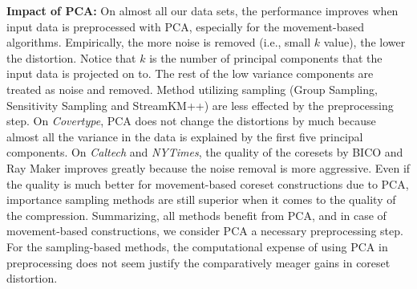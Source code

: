 {\bf Impact of PCA:}
On almost all our data sets, the performance improves when input data is preprocessed with PCA, especially for the movement-based algorithms. Empirically, the more noise is removed (i.e., small $k$ value), the lower the distortion. Notice that $k$ is the number of principal components that the input data is projected on to. The rest of the low variance components are treated as noise and removed. Method utilizing sampling (Group Sampling, Sensitivity Sampling and StreamKM++) are less effected by the preprocessing step. On \textit{Covertype}, PCA does not change the distortions by much because almost all the variance in the data is explained by the first five principal components.
On \textit{Caltech} and \textit{NYTimes}, the quality of the coresets by BICO and Ray Maker improves greatly because the noise removal is more aggressive. Even if the quality is much better for movement-based coreset constructions due to PCA, importance sampling methods are still superior when it comes to the quality of the compression. Summarizing, all methods benefit from PCA, and in case of movement-based constructions, we consider PCA a necessary preprocessing step. For the sampling-based methods, the computational expense of using PCA in preprocessing does not seem justify the comparatively meager gains in coreset distortion.



